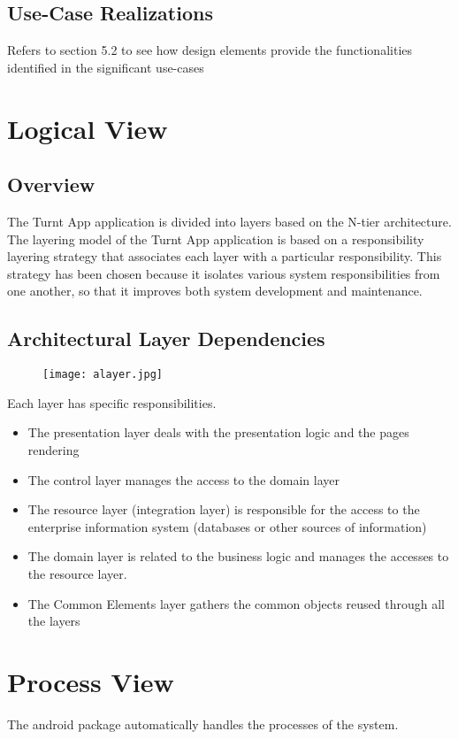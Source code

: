 \documentclass[10pt,a4paper]{article}
\begin{document}
\subsection{Use-Case Realizations}
Refers to section 5.2 to see how design elements provide the functionalities identified in the significant use-cases
\section{Logical View}
\subsection{Overview}
The Turnt App application is divided into layers based on the N-tier architecture.\\
The layering model of the Turnt App application is based on a responsibility layering strategy that associates each layer with a particular responsibility.
This strategy has been chosen because it isolates various system responsibilities from one another, so that it improves both system development and maintenance.
\subsection{Architectural Layer Dependencies}
\begin{figure}[H]
\texttt{[image: alayer.jpg]}
\end{figure}
Each layer has specific responsibilities.
\begin{itemize}
\item The presentation layer deals with the presentation logic and the pages  rendering
\item The control layer manages the access to the domain layer
\item The resource layer (integration layer) is responsible for the access to the enterprise information system (databases or other sources of information)
\item The domain layer is related to the business logic and manages the accesses to the resource layer.
\item	The Common Elements layer gathers the common objects reused through all the layers
\end{itemize}

\section{Process View}
The android package automatically handles the processes of the system.
\end{document}
